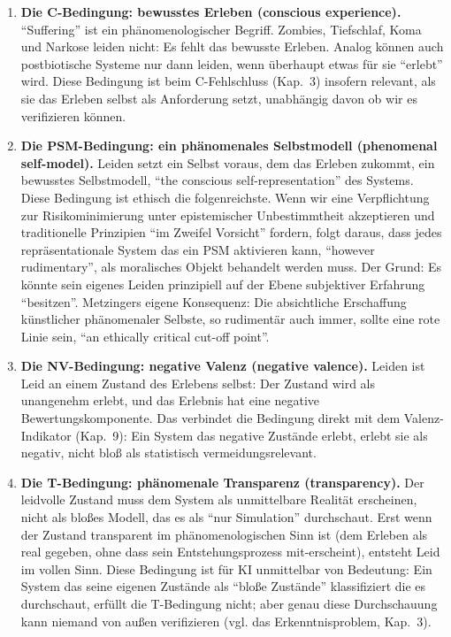 \documentclass[acmlarge, noacm]{acmart}
\begin{document}
\begin{enumerate}
\item \textbf{Die C-Bedingung: bewusstes Erleben (conscious experience).} ``Suffering'' ist ein phänomenologischer Begriff. Zombies, Tiefschlaf, Koma und Narkose leiden nicht: Es fehlt das bewusste Erleben. Analog können auch postbiotische Systeme nur dann leiden, wenn überhaupt etwas für sie ``erlebt'' wird. Diese Bedingung ist beim C-Fehlschluss (Kap.~3) insofern relevant, als sie das Erleben selbst als Anforderung setzt, unabhängig davon ob wir es verifizieren können.

\item \textbf{Die PSM-Bedingung: ein phänomenales Selbstmodell (phenomenal self-model).} Leiden setzt ein Selbst voraus, dem das Erleben zukommt, ein bewusstes Selbstmodell, ``the conscious self-representation'' des Systems. Diese Bedingung ist ethisch die folgenreichste. Wenn wir eine Verpflichtung zur Risikominimierung unter epistemischer Unbestimmtheit akzeptieren und traditionelle Prinzipien ``im Zweifel Vorsicht'' fordern, folgt daraus, dass jedes repräsentationale System das ein PSM aktivieren kann, ``however rudimentary'', als moralisches Objekt behandelt werden muss. Der Grund: Es könnte sein eigenes Leiden prinzipiell auf der Ebene subjektiver Erfahrung ``besitzen''. Metzingers eigene Konsequenz: Die absichtliche Erschaffung künstlicher phänomenaler Selbste, so rudimentär auch immer, sollte eine rote Linie sein, ``an ethically critical cut-off point''.

\item \textbf{Die NV-Bedingung: negative Valenz (negative valence).} Leiden ist Leid an einem Zustand des Erlebens selbst: Der Zustand wird als unangenehm erlebt, und das Erlebnis hat eine negative Bewertungskomponente. Das verbindet die Bedingung direkt mit dem Valenz-Indikator (Kap.~9): Ein System das negative Zustände erlebt, erlebt sie als negativ, nicht bloß als statistisch vermeidungsrelevant.

\item \textbf{Die T-Bedingung: phänomenale Transparenz (transparency).} Der leidvolle Zustand muss dem System als unmittelbare Realität erscheinen, nicht als bloßes Modell, das es als ``nur Simulation'' durchschaut. Erst wenn der Zustand transparent im phänomenologischen Sinn ist (dem Erleben als real gegeben, ohne dass sein Entstehungsprozess mit-erscheint), entsteht Leid im vollen Sinn. Diese Bedingung ist für KI unmittelbar von Bedeutung: Ein System das seine eigenen Zustände als ``bloße Zustände'' klassifiziert die es durchschaut, erfüllt die T-Bedingung nicht; aber genau diese Durchschauung kann niemand von außen verifizieren (vgl. das Erkenntnisproblem, Kap.~3).
\end{enumerate}
\end{document}
